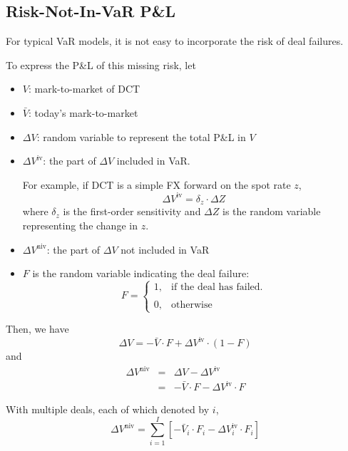 \documentclass[10pt,a4paper]{article}
\newcommand{\inVaR}{{\mathrm{iv}}}
\newcommand{\notInVaR}{{\mathrm{niv}}}
\begin{document}
\subsection{Risk-Not-In-VaR P\&L}

For typical VaR models, it is not easy to incorporate the risk of deal failures. 

To express the P\&L of this missing risk, let
\begin{itemize}
	\item $V$: mark-to-market of DCT
	\item $\bar{V}$: today's mark-to-market
	\item $\Delta V$: random variable to represent the total P\&L in $V$
	\item $\Delta V^\inVaR$: the part of $\Delta V$ included in VaR. 
	
	For example, if DCT is a simple FX forward on the spot rate $z$, 
	\begin{equation}
	\Delta V^\inVaR = \delta_z \cdot \Delta Z
	\label{eqn:pnl-in-var-example}
	\end{equation}
	where $\delta_z$ is the first-order sensitivity and $\Delta Z$ is the random variable representing the change in $z$. 
	\item $\Delta V^\notInVaR$: the part of $\Delta V$ not included in VaR 
	\item $F$ is the random variable indicating the deal failure:
	\begin{equation}
	F = \left\{ 
	\begin{array}{cl}
		1, & \textrm{if the deal has failed.}\\
		\\
		0, & \textrm{otherwise}
	\end{array}
	\right.
	\end{equation}
\end{itemize}
Then, we have
\begin{equation}
\Delta V = -\bar{V} \cdot F + \Delta V^\inVaR \cdot (1 - F)
\end{equation}
and
\begin{eqnarray}
\Delta V^\notInVaR &=& \Delta V - \Delta V^\inVaR\\
& = & -\bar{V} \cdot F - \Delta V^\inVaR  \cdot F 
\end{eqnarray}

With multiple deals, each of which denoted by $i$, 
\begin{equation}
\Delta V^\notInVaR = \sum_{i=1}^{I}\left[ - \bar{V}_i \cdot F_i
- \Delta V_i^\inVaR \cdot F_i \right]
\label{eqn:missing-pnl}
\end{equation}
\end{document}
